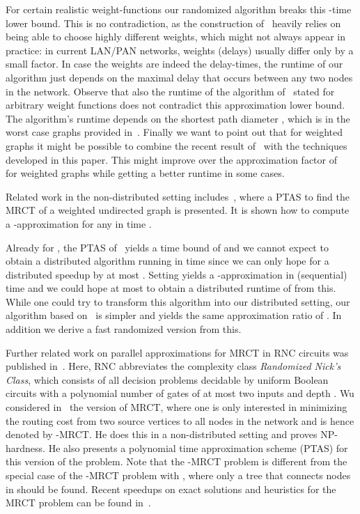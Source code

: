 \documentclass[11pt]{article}
\begin{document}
For certain realistic weight-functions our randomized algorithm breaks this -time lower bound. This is no contradiction, as the construction of~\cite{sarma2012distributed} heavily relies on being able to choose highly different weights, which might not always appear in practice: in current LAN/PAN networks, weights (delays) usually differ only by a small factor. In case the weights are indeed the delay-times, the runtime of our algorithm just depends on the maximal delay that occurs between any two nodes in the network. Observe that also the runtime of the algorithm of~\cite{khan2008efficient} stated for arbitrary weight functions does not contradict this approximation lower bound. The algorithm's runtime depends on the shortest path diameter , which is  in the worst case graphs provided in~\cite{sarma2012distributed}. Finally we want to point out that for weighted graphs it might be possible to combine the recent result of~\cite{nanongkai2014distributed} with the techniques developed in this paper. This might improve over the approximation factor of~\cite{khan2008efficient} for weighted graphs while getting a better runtime in some cases.

Related work in the non-distributed setting includes~\cite{WuLBCRT99}, where a PTAS to find the MRCT of a weighted undirected graph is presented. It is shown how to compute a -approximation for any  in time . 


Already for , the PTAS of~\cite{WuLBCRT99} yields a time bound of  and we cannot expect to obtain a distributed algorithm running in time  since we can only hope for a distributed speedup by at most . Setting  yields a -approximation in (sequential) time  and we could hope at most to obtain a distributed runtime of  from this. While one could try to transform this algorithm into our distributed setting, our algorithm based on~\cite{wong1980worst} is simpler and yields the same approximation ratio of . In addition we derive a fast randomized version from this.

Further related work on parallel approximations for MRCT in RNC circuits was published in~\cite{chang2007parallelized}. Here, RNC abbreviates the complexity class \emph{Randomized Nick's Class}, which consists of all decision problems decidable by uniform Boolean circuits with a polynomial number of gates of at most two inputs and depth .  Wu considered in~\cite{ye2002polynomial} the version of MRCT, where one is only interested in minimizing the routing cost from two source vertices to all nodes in the network and is hence denoted by -MRCT. He does this in a non-distributed setting and proves NP-hardness. He also presents a polynomial time approximation scheme (PTAS) for this version of the problem. Note that the -MRCT problem is different from the special case of the -MRCT problem with , where only a tree that connects nodes in  should be found. 
Recent speedups on exact solutions and heuristics for the MRCT problem can be found in~\cite{campos2008fast,fischetti2002exact}.
\end{document}
